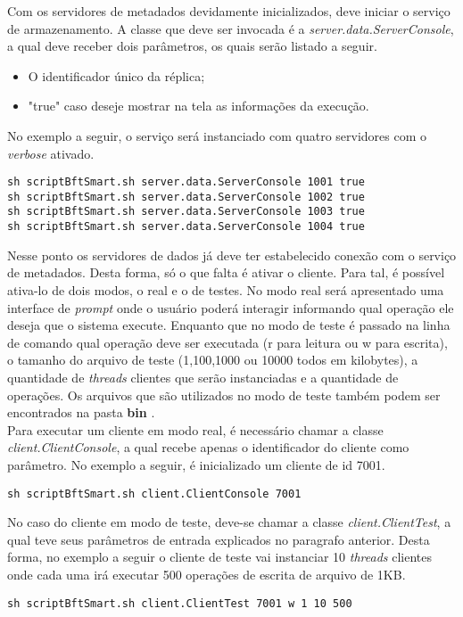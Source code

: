Com os servidores de metadados devidamente inicializados, deve iniciar o serviço de armazenamento. A classe que deve ser invocada é a \textit{server.data.ServerConsole}, a qual deve receber dois parâmetros, os quais serão listado a seguir. 

\begin{itemize}
	\item O identificador único da réplica;
	\item "true" caso deseje mostrar na tela as informações da execução.
\end{itemize}

No exemplo a seguir, o serviço será instanciado com quatro servidores com o \textit{verbose} ativado.

\begin{lstlisting}
sh scriptBftSmart.sh server.data.ServerConsole 1001 true
sh scriptBftSmart.sh server.data.ServerConsole 1002 true
sh scriptBftSmart.sh server.data.ServerConsole 1003 true
sh scriptBftSmart.sh server.data.ServerConsole 1004 true
\end{lstlisting}

Nesse ponto os servidores de dados já deve ter estabelecido conexão com o serviço de metadados. Desta forma, só o que falta é ativar o cliente. Para tal, é possível ativa-lo de dois modos, o real e o de testes. No modo real será apresentado uma interface de \textit{prompt} onde o usuário poderá interagir informando qual operação ele deseja que o sistema execute. Enquanto que no modo de teste é passado na linha de comando qual operação deve ser executada (r para leitura ou w para escrita), o tamanho do arquivo de teste (1,100,1000 ou 10000 todos em kilobytes), a quantidade de \textit{threads} clientes que serão instanciadas e a quantidade de operações. Os arquivos que são utilizados no modo de teste também podem ser encontrados na pasta \textbf{bin }.
\\


Para executar um cliente em modo real, é necessário chamar a classe \textit{client.ClientConsole}, a qual recebe apenas o identificador do cliente como parâmetro. No exemplo a seguir, é inicializado um cliente de id 7001.
\\

\begin{lstlisting}
sh scriptBftSmart.sh client.ClientConsole 7001
\end{lstlisting}

No caso do cliente em modo de teste, deve-se chamar a classe \textit{client.ClientTest}, a qual teve seus parâmetros de entrada explicados no paragrafo anterior. Desta forma, no exemplo a seguir o cliente de teste vai instanciar 10 \textit{threads} clientes onde cada uma irá executar 500 operações de escrita de arquivo de 1KB.

\begin{lstlisting}
sh scriptBftSmart.sh client.ClientTest 7001 w 1 10 500
\end{lstlisting}

